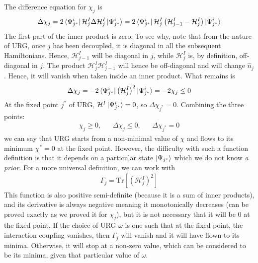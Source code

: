 \documentclass[12pt,twoside]{article}
\numberwithin{equation}{section}
\begin{document}
{\begin{equation}
\end{equation}
The difference equation for \(\chi_j\) is
\begin{equation}\begin{aligned}
	\Delta \chi_j = 2\bra{\Psi^i_{j^*}}\mathcal{H}^I_j\Delta \mathcal{H}^I_j \ket{\Psi^i_{j^*}}= 2\bra{\Psi^i_{j^*}}\mathcal{H}^I_j\left(\mathcal{H}^I_{j-1} - \mathcal{H}^I_j\right)\ket{\Psi^i_{j^*}}\\
\end{aligned}\end{equation}
The first part of the inner product is zero. To see why, note that from the nature of URG, once \(j\) has been decoupled, it is diagonal in all the subsequent Hamiltonians. Hence, \(\mathcal{H}_{j-1}^I\) will be diagonal in \(j\), while \(\mathcal{H}_j^I\) is, by definition, off-diagonal in \(j\). The product \(\mathcal{H}_j^I\mathcal{H}_{j-1}^I\) will hence be off-diagonal and will change \(\hat n_j\). Hence, it will vanish when taken inside an inner product.
\pb What remains is
\begin{equation}\begin{aligned}
	\Delta \chi_j = -2\bra{\Psi^i_{j^*}}\left(\mathcal{H}^I_j\right)^2\ket{\Psi^i_{j^*}} = -2 \chi_j\leq 0\\
\end{aligned}\end{equation}
At the fixed point \(j^*\) of URG, \(\mathcal{H}^I \ket{\Psi^i_{j^*}} = 0\), so \(\Delta \chi_{j^*} = 0\).
Combining the three points:
\begin{equation}\begin{aligned}
\chi_j \geq 0, && \Delta \chi_j \leq 0, && \Delta \chi_{j^*} = 0
\end{aligned}\end{equation}
we can say that URG starts from a non-minimal value of \(\chi\) and flows to its minimum \(\chi^* = 0\) at the fixed point. 
\pb However, the difficulty with such a function definition is that it depends on a particular state \(\ket{\Psi_{j^*}}\) which we do not know \textit{a prior}. For a more universal definition, we can work with
\begin{equation}\begin{aligned}
	\Gamma_j = \text{Tr}\left[\left(\mathcal{H}^I_j\right)^2\right]
\end{aligned}\end{equation}
This function is also positive semi-definite (because it is a sum of inner products), and its derivative is always negative meaning it monotonically decreases (can be proved exactly as we proved it for \(\chi_j\)), but it is not necessary that it will be 0 at the fixed point. If the choice of URG \(\omega\) is one such that at the fixed point, the interaction coupling vanishes, then \(\Gamma_j\) will vanish and it will have flown to its minima. Otherwise, it will stop at a non-zero value, which can be considered to be  its minima, given that particular value of \(\omega\).
}
\end{document}
